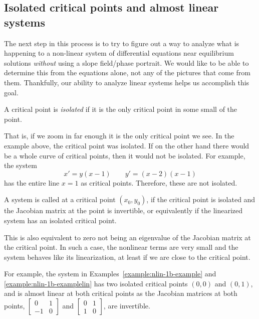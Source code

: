 \subsection{Isolated critical points and almost linear systems}
The next step in this process is to try to figure out a way to analyze what is happening to a non-linear system of differential equations near equilibrium solutions \emph{without} using a slope field/phase portrait. We would like to be able to determine this from the equations alone, not any of the pictures that come from them. Thankfully, our ability to analyze linear systems helps us accomplish this goal. 

\begin{definition}
A critical point is
\emph{isolated}
if it is the only critical point in some small
 of the point. 
\end{definition}
That is, if we zoom in far enough it is the
only critical point we see.  In the example above, the critical point was
isolated.  If on the other hand there would be a whole curve of critical
points, then it would not be isolated. For example, the system
\begin{equation*}
x' = y(x-1) \qquad y' = (x-2)(x-1)
\end{equation*}
has the entire line $x=1$ as critical points. Therefore, these are not isolated.

\begin{definition}
A system is called \emph{} at a critical point
$(x_0,y_0)$, if the critical point is isolated and the Jacobian matrix at the point
is invertible, or equivalently if the linearized system has an isolated
critical point.
\end{definition}
This is also equivalent to zero not being an eigenvalue of the Jacobian matrix at the critical point.
In such a case, the nonlinear terms are very small
and the system behaves like its linearization, at least if we are close
to the critical point.

For example, the system in
Examples~\ref{example:nlin-1b-example} and \ref{example:nlin-1b-examplelin}
has two isolated critical points $(0,0)$ and $(0,1)$, and
is almost linear at both critical points as 
the Jacobian matrices at both points,
$\left[ \begin{smallmatrix} 0 & 1 \\ -1 & 0 \end{smallmatrix} \right]$ and
$\left[ \begin{smallmatrix} 0 & 1 \\ 1 & 0 \end{smallmatrix} \right]$,
are invertible.

